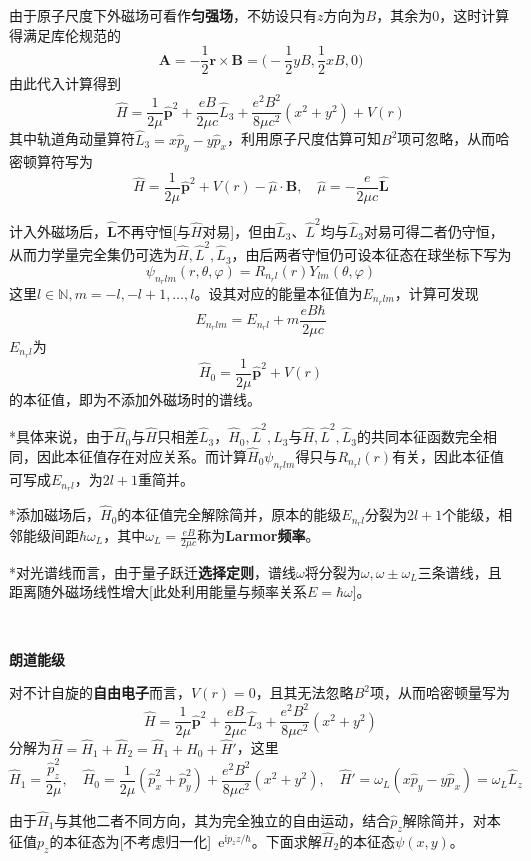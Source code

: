 \documentclass[a4paper,UTF8,fontset=windows]{ctexart}
\newcommand*{\ir}{\mathrm{i}}
\newcommand*{\er}{\mathrm{e}}
\newcommand*{\br}{\mathbf{r}}
\newcommand*{\bp}{\mathbf{p}}
\newcommand*{\ba}{\mathbf{A}}
\begin{document}
由于原子尺度下外磁场可看作\textbf{匀强场}，不妨设只有$z$方向为$B$，其余为0，这时计算得满足库伦规范的
$$\ba=-\frac{1}{2}\br\times\mathbf{B}=\bigg(-\frac{1}{2}yB,\frac{1}{2}xB,0\bigg)$$
由此代入计算得到
$$\hat{H}=\frac{1}{2\mu}\hat{\bp}^2+\frac{eB}{2\mu c}\hat{L}_3+\frac{e^2B^2}{8\mu c^2}(x^2+y^2)+V(r)$$
其中轨道角动量算符$\hat{L}_3=x\hat{p}_y-y\hat{p}_x$，利用原子尺度估算可知$B^2$项可忽略，从而哈密顿算符写为
$$\hat{H}=\frac{1}{2\mu}\hat{\bp}^2+V(r)-\hat{\mu}\cdot\mathbf{B},\quad\hat{\mu}=-\frac{e}{2\mu c}\hat{\mathbf{L}}$$

计入外磁场后，$\hat{\mathbf{L}}$不再守恒[与$\hat{H}$对易]，但由$\hat{L}_3$、$\hat{L}^2$均与$\hat{L}_3$对易可得二者仍守恒，从而力学量完全集仍可选为$\hat{H},\hat{L}^2,\hat{L}_3$，由后两者守恒仍可设本征态在球坐标下写为
$$\psi_{n_rlm}(r,\theta,\varphi)=R_{n_rl}(r)Y_{lm}(\theta,\varphi)$$
这里$l\in\mathbb{N},m=-l,-l+1,\dots,l$。设其对应的能量本征值为$E_{n_rlm}$，计算可发现
$$E_{n_rlm}=E_{n_rl}+m\frac{e B\hbar}{2\mu c}$$
$E_{n_rl}$为
$$\hat{H}_0=\frac{1}{2\mu}\hat{\bp}^2+V(r)$$
的本征值，即为不添加外磁场时的谱线。

*具体来说，由于$\hat{H}_0$与$\hat{H}$只相差$\hat{L}_3$，$\hat{H}_0,\hat{L}^2,\hat{L}_3$与$\hat{H},\hat{L}^2,\hat{L}_3$的共同本征函数完全相同，因此本征值存在对应关系。而计算$\hat{H}_0\psi_{n_rlm}$得只与$R_{n_rl}(r)$有关，因此本征值可写成$E_{n_rl}$，为$2l+1$重简并。

*添加磁场后，$\hat{H}_0$的本征值完全解除简并，原本的能级$E_{n_rl}$分裂为$2l+1$个能级，相邻能级间距$\hbar\omega_L$，其中$\omega_L=\frac{eB}{2\mu c}$称为\textbf{Larmor频率}。

*对光谱线而言，由于量子跃迁\textbf{选择定则}，谱线$\omega$将分裂为$\omega,\omega\pm\omega_L$三条谱线，且距离随外磁场线性增大[此处利用能量与频率关系$E=\hbar\omega$]。

\

\textbf{朗道能级}

对不计自旋的\textbf{自由电子}而言，$V(r)=0$，且其无法忽略$B^2$项，从而哈密顿量写为
$$\hat{H}=\frac{1}{2\mu}\hat{\bp}^2+\frac{eB}{2\mu c}\hat{L}_3+\frac{e^2B^2}{8\mu c^2}(x^2+y^2)$$
分解为$\hat{H}=\hat{H}_1+\hat{H}_2=\hat{H}_1+\hat{H}_0+\hat{H}'$，这里
$$\hat{H}_1=\frac{\hat{p}_z^2}{2\mu},\quad\hat{H}_0=\frac{1}{2\mu}(\hat{p}_x^2+\hat{p}_y^2)+\frac{e^2B^2}{8\mu c^2}(x^2+y^2),\quad\hat{H}'=\omega_L(x\hat{p}_y-y\hat{p}_x)=\omega_L\hat{L}_z$$

由于$\hat{H}_1$与其他二者不同方向，其为完全独立的自由运动，结合$\hat{p}_z$解除简并，对本征值$p_z$的本征态为[不考虑归一化]\ $\er^{\ir p_zz/\hbar}$。下面求解$\hat{H}_2$的本征态$\psi(x,y)$。
\end{document}
